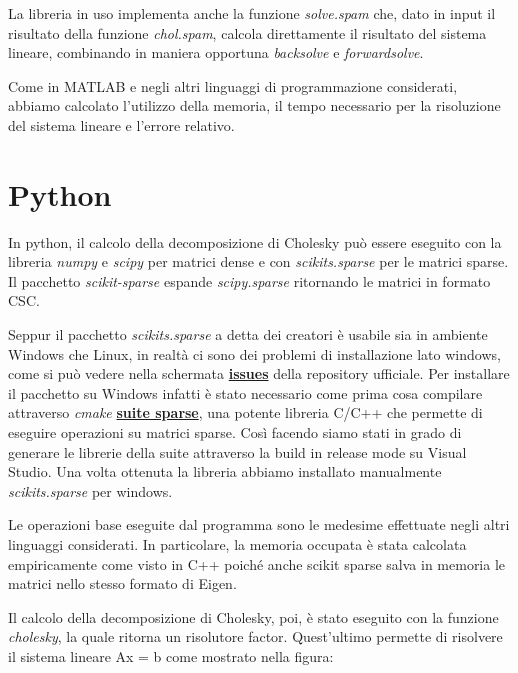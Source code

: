 \documentclass[a4paper,12pt]{article}
\begin{document}
\noindent La libreria in uso implementa anche la funzione \textit{solve.spam} che, dato in input il risultato della funzione \textit{chol.spam}, calcola direttamente il risultato del sistema lineare, combinando in maniera opportuna \textit{backsolve} e \textit{forwardsolve}.
\bigskip

\noindent Come in MATLAB e negli altri linguaggi di programmazione considerati, abbiamo calcolato l’utilizzo della memoria, il tempo necessario per la risoluzione del sistema lineare e l’errore relativo. 

\newpage

\section{Python}
In python, il calcolo della decomposizione di Cholesky può essere eseguito con la libreria \textit{numpy} e \textit{scipy} per matrici dense e con \textit{scikits.sparse} per le matrici sparse. Il pacchetto \textit{scikit-sparse} espande \textit{scipy.sparse} ritornando le matrici in formato CSC.
\bigskip

\noindent Seppur il pacchetto \textit{scikits.sparse} a detta dei creatori è usabile sia in ambiente Windows che Linux, in realtà ci sono dei problemi di installazione lato windows, come si può vedere nella schermata \href{https://github.com/scikit-sparse/scikit-sparse/issues}{\textbf{issues}} della repository ufficiale. Per installare il pacchetto su Windows infatti è stato necessario come prima cosa compilare attraverso \textit{cmake} \href{https://github.com/DrTimothyAldenDavis/SuiteSparse}{\textbf{suite sparse}}, una potente libreria C/C++ che permette di eseguire operazioni su matrici sparse. Così facendo siamo stati in grado di generare le librerie della suite attraverso la build in release mode su Visual Studio. Una volta ottenuta la libreria abbiamo installato manualmente \textit{scikits.sparse} per windows.
\bigskip

\noindent Le operazioni base eseguite dal programma sono le medesime effettuate negli altri linguaggi considerati. In particolare, la memoria occupata è stata calcolata empiricamente come visto in C++ poiché anche scikit sparse salva in memoria le matrici nello stesso formato di Eigen. 
\bigskip

\noindent Il calcolo della decomposizione di Cholesky, poi, è stato eseguito con la funzione \textit{cholesky}, la quale ritorna un risolutore factor. Quest’ultimo permette di risolvere il sistema lineare Ax = b come mostrato nella figura:
\end{document}
